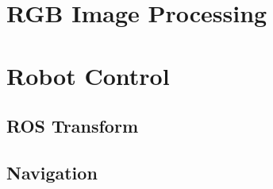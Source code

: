 \section{RGB Image Processing}


\section{Robot Control}
\subsection{ROS Transform}
\subsection{Navigation}
